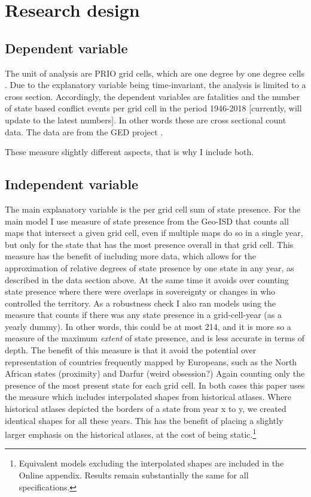 \documentclass[12pt]{article}
\begin{document}

\section{Research design}

\subsection{Dependent variable}

The unit of analysis are PRIO grid cells, which are one degree by one degree
cells \citep{Tollefsen2012}. Due to the explanatory variable being
time-invariant, the analysis is limited to a cross section. Accordingly, the
dependent variables are fatalities and the number of state based conflict events
per grid cell in the period 1946-2018 [currently, will update to the latest
numbers]. In other words these are cross sectional count data. The data are from
the GED project \citep{Sundberg2013}.

These measure slightly different aspects, that is why I include both.


\subsection{Independent variable}

The main explanatory variable is the per grid cell sum of state presence. For
the main model I use measure of state presence from the Geo-ISD that counts all
maps that intersect a given grid cell, even if multiple maps do so in a single
year, but only for the state that has the most presence overall in that grid
cell. This measure has the benefit of including more data, which allows for the
approximation of relative degrees of state presence by one state in any year, as
described in the data section above. At the same time it avoids over counting
state presence where there were overlaps in sovereignty or changes in who
controlled the territory. As a robustness check I also ran models using the
measure that counts if there was any state presence in a grid-cell-year (as a
yearly dummy). In other words, this could be at most 214, and it is more so a
measure of the maximum \textit{extent} of state presence, and is less accurate
in terms of depth. The benefit of this measure is that it avoid the potential
over representation of countries frequently mapped by Europeans, such as the
North African states (proximity) and Darfur (weird obsession?) Again counting
only the presence of the most present state for each grid cell. In both cases
this paper uses the measure which includes interpolated shapes from historical
atlases. Where historical atlases depicted the borders of a state from year x to
y, we created identical shapes for all these years. This has the benefit of
placing a slightly larger emphasis on the historical atlases, at the cost of
being static.\footnote{Equivalent models excluding the interpolated shapes are
included in the Online appendix. Results remain substantially the same for all
specifications.}
\end{document}
